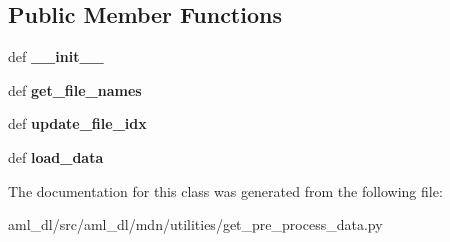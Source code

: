 \subsection*{Public Member Functions}
\begin{DoxyCompactItemize}
\item 
\hypertarget{classsrc_1_1aml__dl_1_1mdn_1_1utilities_1_1get__pre__process__data_1_1_load_preprocess_data_a8a19efbe586a07ceb103b9f393aa96e0}{def {\bfseries \-\_\-\-\_\-init\-\_\-\-\_\-}}\label{classsrc_1_1aml__dl_1_1mdn_1_1utilities_1_1get__pre__process__data_1_1_load_preprocess_data_a8a19efbe586a07ceb103b9f393aa96e0}

\item 
\hypertarget{classsrc_1_1aml__dl_1_1mdn_1_1utilities_1_1get__pre__process__data_1_1_load_preprocess_data_a3845622f8dffba8f59b154540f70c74d}{def {\bfseries get\-\_\-file\-\_\-names}}\label{classsrc_1_1aml__dl_1_1mdn_1_1utilities_1_1get__pre__process__data_1_1_load_preprocess_data_a3845622f8dffba8f59b154540f70c74d}

\item 
\hypertarget{classsrc_1_1aml__dl_1_1mdn_1_1utilities_1_1get__pre__process__data_1_1_load_preprocess_data_add4e5d98ff7c6dcf58e3ee766348949a}{def {\bfseries update\-\_\-file\-\_\-idx}}\label{classsrc_1_1aml__dl_1_1mdn_1_1utilities_1_1get__pre__process__data_1_1_load_preprocess_data_add4e5d98ff7c6dcf58e3ee766348949a}

\item 
\hypertarget{classsrc_1_1aml__dl_1_1mdn_1_1utilities_1_1get__pre__process__data_1_1_load_preprocess_data_afc7d5d2e1a5f2cfd71efc07d35195802}{def {\bfseries load\-\_\-data}}\label{classsrc_1_1aml__dl_1_1mdn_1_1utilities_1_1get__pre__process__data_1_1_load_preprocess_data_afc7d5d2e1a5f2cfd71efc07d35195802}

\end{DoxyCompactItemize}


The documentation for this class was generated from the following file\-:\begin{DoxyCompactItemize}
\item 
aml\-\_\-dl/src/aml\-\_\-dl/mdn/utilities/get\-\_\-pre\-\_\-process\-\_\-data.\-py\end{DoxyCompactItemize}

